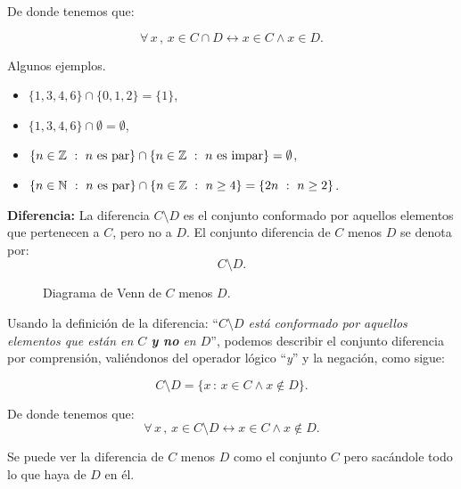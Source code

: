 De donde tenemos que:

$$\forall\, x \,,\, 
x\in C\cap  D \leftrightarrow x\in C\wedge x\in D.$$

\begin{ejemplo}
	Algunos ejemplos.
	\begin{itemize}
		\item $\{1,3,4,6\}\cap\{ 0,1,2\}=\{1\}$,
		\item $\{1,3,4,6\}\cap\emptyset=\emptyset$,
		\item $\{n\in\mathbb{Z}\ :\ n\textrm{ es par}\}
			\cap\{ n\in\mathbb{Z}\ :\ n\textrm{ es impar}\}=\emptyset$,
		\item $\{n\in\mathbb{N}\ :\ n\textrm{ es par}\}\cap
			\{ n\in\mathbb{Z}\ :\ n\ge 4\}=\{ 2n\ :\ n\ge 2\}$.
	\end{itemize}
\end{ejemplo}


\textbf{Diferencia:} La diferencia $C\setminus D$  
es el conjunto conformado por aquellos elementos que pertenecen a $C$, 
pero no a $D$. 
El conjunto diferencia de $C$ menos $D$ se denota por:
$$ C\setminus  D.$$

\begin{center}
	\begin{figure}[h!]
		\begin{center}
		\end{center}
		\caption{Diagrama de Venn de  $C$ menos $D$.}
	\end{figure}
\end{center}

Usando la definición de la diferencia: 
``{\em $C\setminus D$ está conformado por aquellos elementos que 
	están en $C$ \textbf{ y no} en $D$}'', 
podemos describir el conjunto diferencia por comprensi\'on, 
valiéndonos del operador lógico ``{\em y}'' y la negación, como sigue:

$$C\setminus  D=\{ x \, : \,x\in C\wedge x\not\in D\}.$$

De donde tenemos que:
$$\forall\, x \,,\,
x\in C\setminus  D \leftrightarrow x\in C\wedge x\not\in D.$$

Se puede ver la diferencia de $C$ menos $D$ como el conjunto $C$ 
pero sacándole todo lo que haya de $D$ en él.

